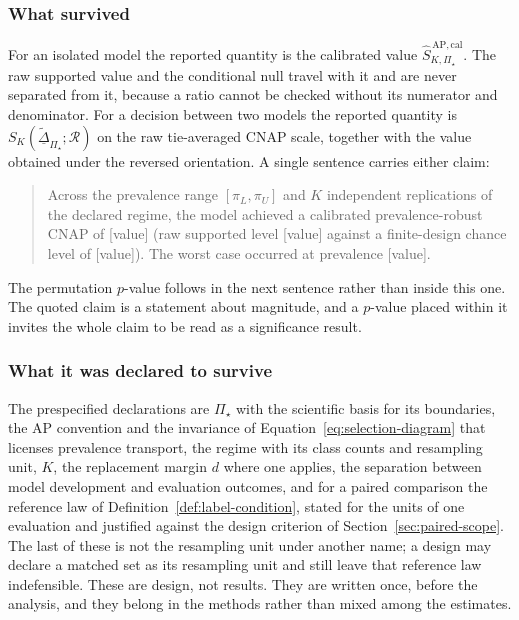 \documentclass[11pt]{article}
\newcommand{\Regime}{\mathcal{R}}
\newcommand{\PSet}{\Pi_\star}
\newcommand{\SRobCalHat}{\widehat S_{K,\PSet}^{\,\mathrm{AP,cal}}}
\newcommand{\RobDta}{\underline{\widetilde{\Delta}}_{\PSet}}
\theoremstyle{remark}
\begin{document}
\subsubsection*{What survived}

For an isolated model the reported quantity is the calibrated value $\SRobCalHat$. The raw supported value and the conditional null travel with it and are never separated from it, because a ratio cannot be checked without its numerator and denominator. For a decision between two models the reported quantity is $S_K(\RobDta;\Regime)$ on the raw tie-averaged CNAP scale, together with the value obtained under the reversed orientation. A single sentence carries either claim:

\begin{quote}
Across the prevalence range $[\pi_L,\pi_U]$ and $K$ independent replications of the declared regime, the model achieved a calibrated prevalence-robust CNAP of [value] (raw supported level [value] against a finite-design chance level of [value]). The worst case occurred at prevalence [value].
\end{quote}

The permutation $p$-value follows in the next sentence rather than inside this one. The quoted claim is a statement about magnitude, and a $p$-value placed within it invites the whole claim to be read as a significance result.

\subsubsection*{What it was declared to survive}

The prespecified declarations are $\PSet$ with the scientific basis for its boundaries, the AP convention and the invariance of Equation~\eqref{eq:selection-diagram} that licenses prevalence transport, the regime with its class counts and resampling unit, $K$, the replacement margin $d$ where one applies, the separation between model development and evaluation outcomes, and for a paired comparison the reference law of Definition~\ref{def:label-condition}, stated for the units of one evaluation and justified against the design criterion of Section~\ref{sec:paired-scope}. The last of these is not the resampling unit under another name; a design may declare a matched set as its resampling unit and still leave that reference law indefensible. These are design, not results. They are written once, before the analysis, and they belong in the methods rather than mixed among the estimates.
\end{document}
